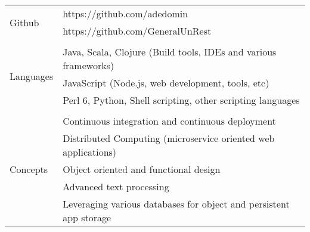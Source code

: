 \documentclass[10pt,letterpaper,]{article}
\begin{document}
\begin{center}
\begin{tabular}{l|l}
    \multirow{2}{*}{Github} & https://github.com/adedomin \\
                            & https://github.com/GeneralUnRest \\
    \\
    \multirow{3}{*}{Languages} & Java, Scala, Clojure (Build tools, IDEs and various frameworks) \\
                               & JavaScript (Node.js, web development, tools, etc) \\
                               & Perl 6, Python, Shell scripting, other scripting languages \\
    \\
    \multirow{5}{*}{Concepts} & Continuous integration and continuous deployment \\
                              & Distributed Computing (microservice oriented web applications) \\
                              & Object oriented and functional design \\
                              & Advanced text processing \\
                              & Leveraging various databases for object and persistent app storage \\
\end{tabular}
\end{center}
\end{document}
